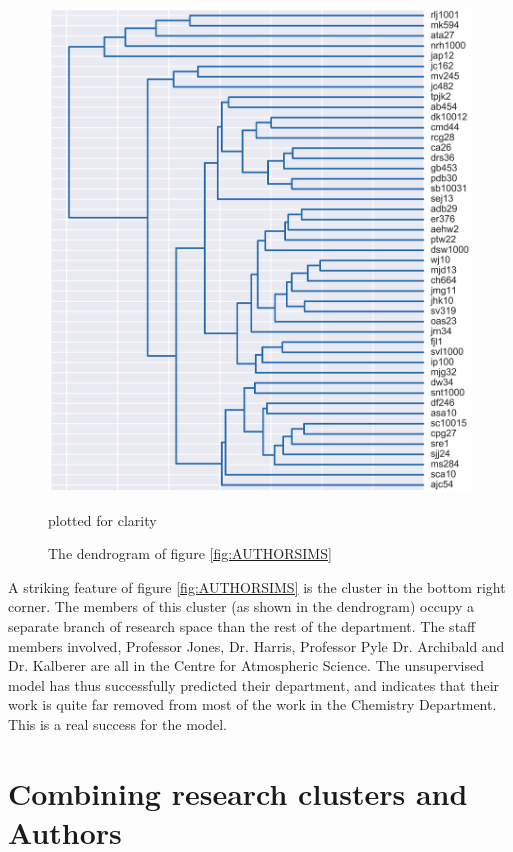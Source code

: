 \begin{center}
\begin{figure}[H]
\label{fig:DENDRO}
  \centering
    \includegraphics[scale=0.8]{Analysis/dendro.png}
    \caption{The dendrogram of figure \ref{fig:AUTHORSIMS}} plotted for clarity
\end{figure} 
\end{center}
A striking feature of figure \ref{fig:AUTHORSIMS} is the cluster in the bottom right corner. The members of this cluster (as shown in the dendrogram) occupy a separate branch of research space than the rest of the department. The staff members involved, Professor Jones, Dr. Harris, Professor Pyle Dr. Archibald and Dr. Kalberer are all in the Centre for Atmospheric Science. The unsupervised model has thus successfully predicted their department, and indicates that their work is quite far removed from most of the work in the Chemistry Department. This is a real success for the model.
\section{Combining research clusters and Authors}